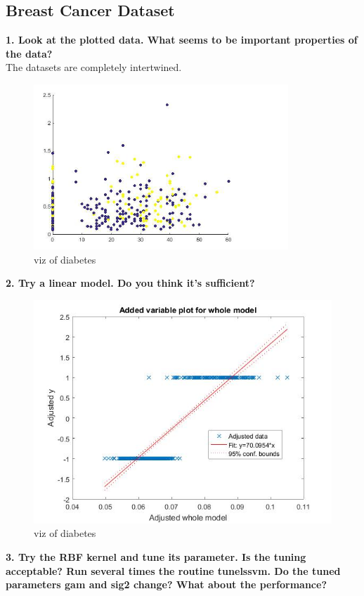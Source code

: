 \documentclass[11pt,oneside,a4paper]{article}
\begin{document}
\subsection{Breast Cancer Dataset}

\textbf{1. Look at the plotted data. What seems to be important properties of the data?}\\

The datasets are completely intertwined.

\begin{figure}[H]
	\centering
	\includegraphics[scale=0.4]{../Figures/diabetes_viz}
	\caption{viz of diabetes }
\end{figure}
\textbf{2. Try a linear model. Do you think it’s sufficient?}\\
\begin{figure}[H]
	\centering
	\includegraphics[scale=0.4]{../Figures/diabetes_linear}
	\caption{viz of diabetes }
\end{figure}
\textbf{3. Try the RBF kernel and tune its parameter. Is the tuning acceptable? Run several times the routine tunelssvm. Do the tuned parameters gam and sig2 change? What about the performance?}\\
\end{document}
